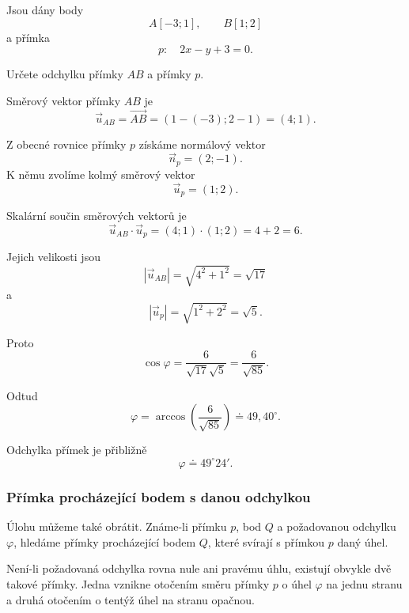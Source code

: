 \begin{example}\label{exa:Angle_line_through_points_and_general_line}
    Jsou dány body
    \[
        A[-3;1],
        \qquad
        B[1;2]
    \]
    a přímka
    \[
        p:\quad 2x-y+3=0.
    \]

    Určete odchylku přímky $AB$ a přímky $p$.

    Směrový vektor přímky $AB$ je
    \[
        \vec{u}_{AB}
        =
        \overrightarrow{AB}
        =
        (1-(-3);2-1)
        =
        (4;1).
    \]

    Z obecné rovnice přímky $p$ získáme normálový vektor
    \[
        \vec{n}_p=(2;-1).
    \]
    K němu zvolíme kolmý směrový vektor
    \[
        \vec{u}_p=(1;2).
    \]

    Skalární součin směrových vektorů je
    \[
        \vec{u}_{AB}\cdot\vec{u}_p
        =
        (4;1)\cdot(1;2)
        =
        4+2
        =
        6.
    \]

    Jejich velikosti jsou
    \[
        |\vec{u}_{AB}|=\sqrt{4^2+1^2}=\sqrt{17}
    \]
    a
    \[
        |\vec{u}_p|=\sqrt{1^2+2^2}=\sqrt5.
    \]

    Proto
    \[
        \cos\varphi
        =
        \frac{6}{\sqrt{17}\sqrt5}
        =
        \frac{6}{\sqrt{85}}.
    \]

    Odtud
    \[
        \varphi
        =
        \arccos\left(\frac{6}{\sqrt{85}}\right)
        \doteq
        49{,}40^\circ.
    \]

    Odchylka přímek je přibližně
    \[
        \varphi\doteq49^\circ24'.
    \]
\end{example}





\subsubsection{Přímka procházející bodem s danou odchylkou}
\label{subsubsec:Line_through_point_given_angle}

Úlohu můžeme také obrátit. Známe-li přímku $p$, bod $Q$ a požadovanou
odchylku $\varphi$, hledáme přímky procházející bodem $Q$, které
svírají s přímkou $p$ daný úhel.

Není-li požadovaná odchylka rovna nule ani pravému úhlu, existují
obvykle dvě takové přímky. Jedna vznikne otočením směru přímky $p$
o úhel $\varphi$ na jednu stranu a druhá otočením o tentýž úhel na
stranu opačnou.

